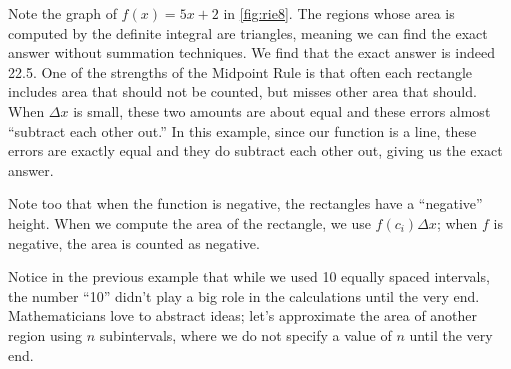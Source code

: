 \begin{example}
Note the graph of $f(x) = 5x+2$ in \autoref{fig:rie8}. The regions whose area is computed by the definite integral are triangles, meaning we can find the exact answer without summation techniques. We find that the exact answer is indeed 22.5. One of the strengths of the Midpoint Rule is that often each rectangle includes area that should not be counted, but misses other area that should. When $\Delta x$ is small, these two amounts are about equal and these errors almost ``subtract each other out.'' In this example, since our function is a line, these errors are exactly equal and they do subtract each other out, giving us the exact answer.

Note too that when the function is negative, the rectangles have a ``negative'' height. When we compute the area of the rectangle, we use $f(c_i)\Delta x$; when $f$ is negative, the area is counted as negative.
\end{example}

Notice in the previous example that while we used 10 equally spaced intervals, the number ``10'' didn't play a big role in the calculations until the very end. Mathematicians love to abstract ideas; let's approximate the area of another region using $n$ subintervals, where we do not specify a value of $n$ until the very end.

